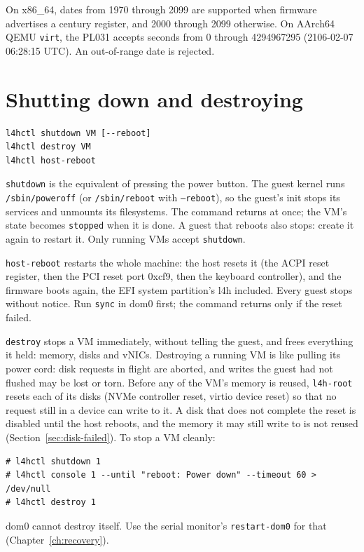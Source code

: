 \documentclass[11pt,a4paper]{report}
\newcommand{\cmd}[1]{\texttt{#1}}
\newcommand{\file}[1]{\texttt{#1}}
\begin{document}
On x86\_64, dates from 1970 through 2099 are supported when firmware
advertises a century register, and 2000 through 2099 otherwise. On
AArch64 QEMU \texttt{virt}, the PL031 accepts seconds from 0 through
4294967295 (2106-02-07 06:28:15 UTC). An out-of-range date is rejected.

\section{Shutting down and destroying}

\begin{lstlisting}
l4hctl shutdown VM [--reboot]
l4hctl destroy VM
l4hctl host-reboot
\end{lstlisting}

\cmd{shutdown} is the equivalent of pressing the power button. The guest
kernel runs \file{/sbin/poweroff} (or \file{/sbin/reboot} with
\texttt{--reboot}), so the guest's init stops its services and unmounts its
filesystems. The command returns at once; the VM's state becomes
\texttt{stopped} when it is done. A guest that reboots also stops: create it
again to restart it. Only running VMs accept \cmd{shutdown}.

\cmd{host-reboot} restarts the whole machine: the host resets it (the
ACPI reset register, then the PCI reset port 0xcf9, then
the keyboard controller), and the firmware boots again, the EFI system
partition's l4h included. Every guest stops without notice. Run
\cmd{sync} in dom0 first; the command returns only if the reset failed.

\cmd{destroy} stops a VM immediately, without telling the guest, and frees
everything it held: memory, disks and vNICs. Destroying a running VM is like
pulling its power cord: disk requests in flight are aborted, and writes the
guest had not flushed may be lost or torn. Before any of the VM's memory is
reused, \texttt{l4h-root} resets each of its disks (NVMe controller reset,
virtio device reset) so that no request still in a device can write to
it. A disk that does not complete the reset is disabled until the host
reboots, and the memory it may still write to is not reused
(Section~\ref{sec:disk-failed}). To stop a VM cleanly:
\begin{lstlisting}
# l4hctl shutdown 1
# l4hctl console 1 --until "reboot: Power down" --timeout 60 > /dev/null
# l4hctl destroy 1
\end{lstlisting}
dom0 cannot destroy itself. Use the serial monitor's \texttt{restart-dom0}
for that (Chapter~\ref{ch:recovery}).
\end{document}
